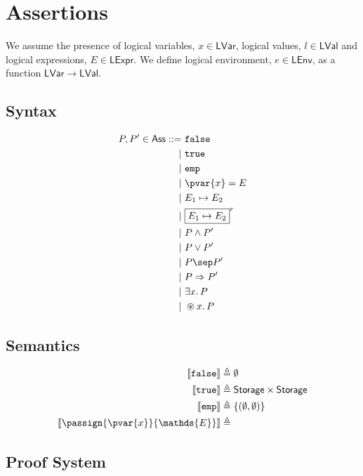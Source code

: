 \section{Assertions}

We assume the presence of logical variables, $x \in \mathsf{LVar}$, logical values, $l \in \mathsf{LVal}$ and logical expressions, $E \in \mathsf{LExpr}$. We define logical environment, $e \in \mathsf{LEnv}$, as a function $\mathsf{LVar} \rightarrow \mathsf{LVal}$.

\subsection{Syntax}

\begin{align*}
P, P' \in \mathsf{Ass} ::=&
\ \mathtt{false} \\
|&\ \mathtt{true} \\
|&\ \mathtt{emp} \\
|&\ \pvar{x} = E \\
|&\ E_1 \mapsto E_2 \\
|&\ \boxed{E_1 \mapsto E_2}^r \\
|&\ P \land P' \\
|&\ P \lor P' \\
|&\ P \sep P' \\
|&\ P \Rightarrow P' \\
|&\ \exists x \ldotp P \\
|&\ \circledast x \ldotp P
\end{align*}

\subsection{Semantics}

\begin{align*}
\llbracket \mathtt{false} \rrbracket &\triangleq \emptyset \\
\llbracket \mathtt{true} \rrbracket &\triangleq \mathsf{Storage} \times \mathsf{Storage} \\
\llbracket \mathtt{emp} \rrbracket &\triangleq \{ (\emptyset, \emptyset) \} \\
\llbracket \passign{\pvar{x}}{\mathds{E}} \rrbracket &\triangleq 
\end{align*}

\subsection{Proof System}

